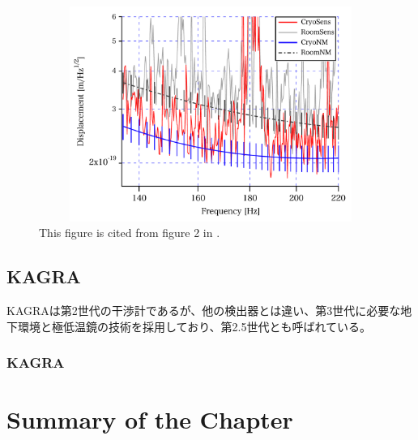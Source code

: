 \begin{figure}[h]
  \begin{center}   
    \includegraphics[width=12cm,height=7cm]{./img_chap1/img123.png}
    \caption{This figure is cited from figure 2 in \cite{uchiyama2012reduction}. } \label{img:img123}
  \end{center}
\end{figure}

\subsection{KAGRA}
KAGRAは第2世代の干渉計であるが、他の検出器とは違い、第3世代に必要な地下環境と極低温鏡の技術を採用しており、第2.5世代とも呼ばれている。

\subsubsection{KAGRA}



\section{Summary of the Chapter}
